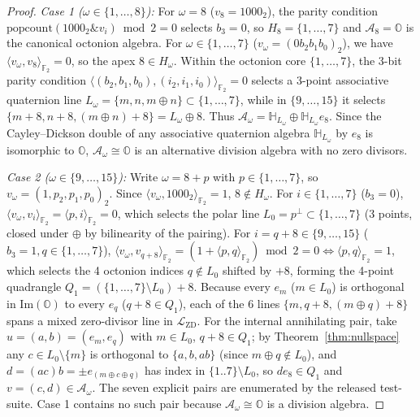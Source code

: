\documentclass[11pt,a4paper]{article}
\theoremstyle{definition}
\theoremstyle{remark}
\newcommand{\Ha}{\mathbb{H}}
\newcommand{\Oc}{\mathbb{O}}
\newcommand{\Ftwo}{\mathbb{F}_2}
\newcommand{\ImPart}{\mathrm{Im}}
\newcommand{\popcount}{\mathrm{popcount}}
\begin{document}
\begin{proof}
\textit{Case 1 ($\omega \in \{1, \dots, 8\}$):} For $\omega = 8$ ($v_8 = 1000_2$), the parity condition $\popcount(1000_2 \mathbin{\&} v_i) \bmod 2 = 0$ selects $b_3 = 0$, so $H_8 = \{1, \dots, 7\}$ and $\mathcal{A}_8 = \Oc$ is the canonical octonion algebra. For $\omega \in \{1, \dots, 7\}$ ($v_\omega = (0b_2b_1b_0)_2$), we have $\langle v_\omega, v_8 \rangle_{\Ftwo} = 0$, so the apex $8 \in H_\omega$. Within the octonion core $\{1, \dots, 7\}$, the 3-bit parity condition $\langle (b_2, b_1, b_0), (i_2, i_1, i_0) \rangle_{\Ftwo} = 0$ selects a 3-point associative quaternion line $L_\omega = \{m, n, m \oplus n\} \subset \{1, \dots, 7\}$, while in $\{9, \dots, 15\}$ it selects $\{m+8, n+8, (m \oplus n)+8\} = L_\omega \oplus 8$. Thus $\mathcal{A}_\omega = \Ha_{L_\omega} \oplus \Ha_{L_\omega} e_8$. Since the Cayley--Dickson double of any associative quaternion algebra $\Ha_{L_\omega}$ by $e_8$ is isomorphic to $\Oc$, $\mathcal{A}_\omega \cong \Oc$ is an alternative division algebra with no zero divisors.

\textit{Case 2 ($\omega \in \{9, \dots, 15\}$):} Write $\omega = 8 + p$ with $p \in \{1, \dots, 7\}$, so $v_\omega = (1, p_2, p_1, p_0)_2$. Since $\langle v_\omega, 1000_2 \rangle_{\Ftwo} = 1$, $8 \notin H_\omega$. For $i \in \{1, \dots, 7\}$ ($b_3 = 0$), $\langle v_\omega, v_i \rangle_{\Ftwo} = \langle p, i \rangle_{\Ftwo} = 0$, which selects the polar line $L_0 = p^\perp \subset \{1, \dots, 7\}$ (3 points, closed under $\oplus$ by bilinearity of the pairing). For $i = q + 8 \in \{9, \dots, 15\}$ ($b_3 = 1, q \in \{1, \dots, 7\}$), $\langle v_\omega, v_{q+8} \rangle_{\Ftwo} = (1 + \langle p, q \rangle_{\Ftwo}) \bmod 2 = 0 \iff \langle p, q \rangle_{\Ftwo} = 1$, which selects the 4 octonion indices $q \notin L_0$ shifted by $+8$, forming the 4-point quadrangle $Q_1 = (\{1, \dots, 7\} \setminus L_0) + 8$. Because every $e_m$ ($m \in L_0$) is orthogonal in $\ImPart(\Oc)$ to every $e_q$ ($q+8 \in Q_1$), each of the 6 lines $\{m, q+8, (m \oplus q)+8\}$ spans a mixed zero-divisor line in $\mathcal{L}_{\mathrm{ZD}}$. For the internal annihilating pair, take $u = (a, b) = (e_m, e_q)$ with $m \in L_0$, $q+8 \in Q_1$; by Theorem~\ref{thm:nullspace} any $c \in L_0 \setminus \{m\}$ is orthogonal to $\{a, b, ab\}$ (since $m \oplus q \notin L_0$), and $d = (ac)b = \pm e_{(m \oplus c \oplus q)}$ has index in $\{1..7\} \setminus L_0$, so $d e_8 \in Q_1$ and $v = (c, d) \in \mathcal{A}_\omega$. The seven explicit pairs are enumerated by the released test-suite. Case 1 contains no such pair because $\mathcal{A}_\omega \cong \Oc$ is a division algebra.
\end{proof}
\end{document}
